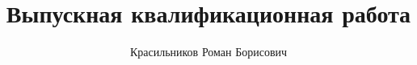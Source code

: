\title{Выпускная квалификационная работа}
\author{Красильников Роман Борисович}

\maketitle

\clearpage